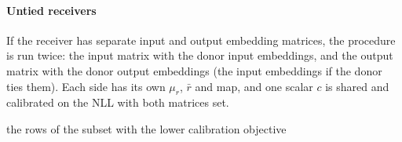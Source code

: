\documentclass[preprint,12pt]{elsarticle}
\begin{document}
\paragraph{Untied receivers} If the receiver has separate input and output embedding matrices, the procedure is run twice: the input matrix with the donor input embeddings, and the output matrix with the donor output embeddings (the input embeddings if the donor ties them). Each side has its own $\mu_r$, $\bar r$ and map, and one scalar $c$ is shared and calibrated on the NLL with both matrices set.

\begin{algorithm}[t]
\caption{Calibrated ridge initialisation}
\label{alg:ridge}
\Return the rows of the subset with the lower calibration objective\;
\end{algorithm}
\end{document}

